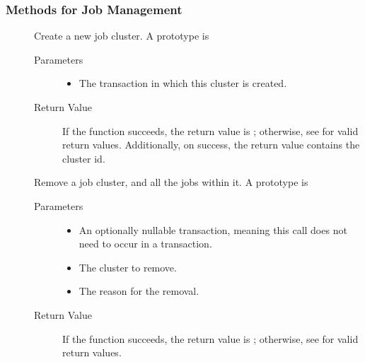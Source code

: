 \subsubsection{\label{WebService-JobManagement} Methods for Job Management}

\begin{description}
\item []
  Create a new job cluster.
  A prototype is 


  \begin{description}
    \item[ Parameters]
    \begin{itemize}
      \item {} 
      The transaction in which this cluster is created.
    \end{itemize}
    \item[ Return Value]
      If the function succeeds, the return value is ; 
      otherwise, see  for valid return values. Additionally,
      on success, the return value contains the cluster id.
  \end{description}

\item []
  Remove a job cluster, and all the jobs within it.
  A prototype is 


  \begin{description}
    \item[ Parameters]
    \begin{itemize}
      \item {} 
      An optionally nullable transaction, meaning this call does not 
      need to occur in a transaction. 
      \item {} 
      The cluster to remove.
      \item {}
      The reason for the removal.
    \end{itemize}
    \item[ Return Value]
      If the function succeeds, the return value is ; 
      otherwise, see  for valid return values. 
  \end{description}


\end{description}
